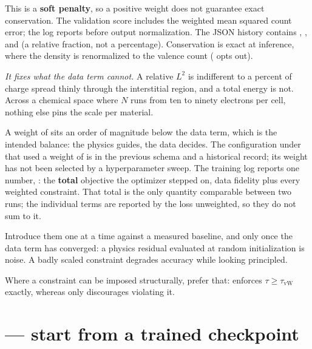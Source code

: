 This is a \textbf{soft penalty}, so a positive weight does not guarantee exact conservation. The validation score includes the weighted mean squared count error; the log reports  before output normalization. The JSON history contains , , and  (a relative fraction, not a percentage). Conservation is exact at inference, where the density is renormalized to the valence count ( opts out).

\emph{It fixes what the data term cannot.} A relative $L^2$ is indifferent to a percent of charge spread thinly through the interstitial region, and a total energy is not. Across a chemical space where $N$ runs from ten to ninety electrons per cell, nothing else pins the scale per material.

A weight of  sits an order of magnitude below the data term, which is the intended balance: the physics guides, the data decides. The configuration under  that used a weight of  is in the previous schema and a historical record; its weight has not been selected by a hyperparameter sweep. The training log reports one number, : the \textbf{total} objective the optimizer stepped on, data fidelity plus every weighted constraint. That total is the only quantity comparable between two runs; the individual terms are reported by the loss unweighted, so they do not sum to it.

\begin{pwarn}
Introduce them one at a time against a measured baseline, and only once the data term has converged: a physics residual evaluated at random initialization is noise. A badly scaled constraint degrades accuracy while looking principled.
\end{pwarn}

Where a constraint can be imposed structurally, prefer that:  enforces $\tau\ge\tau_\mathrm{vW}$ exactly, whereas  only discourages violating it.

\section{ --- start from a trained checkpoint}

